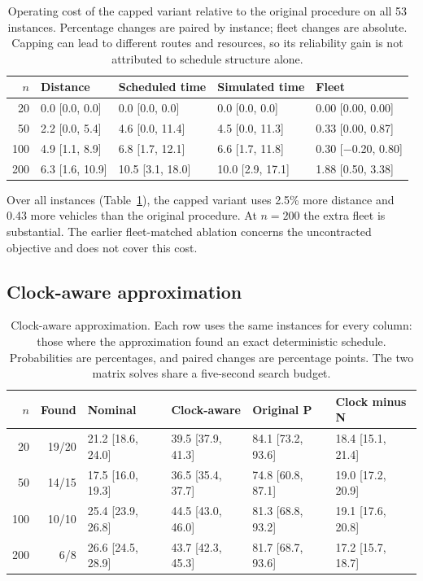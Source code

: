 \begin{table}[htbp]
\centering
\scriptsize
\caption{Operating cost of the capped variant relative to the original procedure on all 53 instances. Percentage changes are paired by instance; fleet changes are absolute. Capping can lead to different routes and resources, so its reliability gain is not attributed to schedule structure alone.}
\label{tab:cap-cost}
\begin{tabular}{rllll}
\toprule
$n$ & Distance & Scheduled time & Simulated time & Fleet\\
\midrule
20 & 0.0 [0.0, 0.0] & 0.0 [0.0, 0.0] & 0.0 [0.0, 0.0] & 0.00 [0.00, 0.00]\\
50 & 2.2 [0.0, 5.4] & 4.6 [0.0, 11.4] & 4.5 [0.0, 11.3] & 0.33 [0.00, 0.87]\\
100 & 4.9 [1.1, 8.9] & 6.8 [1.7, 12.1] & 6.6 [1.7, 11.8] & 0.30 [$-$0.20, 0.80]\\
200 & 6.3 [1.6, 10.9] & 10.5 [3.1, 18.0] & 10.0 [2.9, 17.1] & 1.88 [0.50, 3.38]\\
\bottomrule
\end{tabular}
\end{table}


Over all instances (Table~\ref{tab:cap-cost}), the capped variant uses 2.5\% more distance and 0.43 more vehicles than the original procedure. At $n=200$ the extra fleet is substantial. The earlier fleet-matched ablation concerns the uncontracted objective and does not cover this cost.

\subsection{Clock-aware approximation}

\begin{table}[htbp]
\centering
\scriptsize
\caption{Clock-aware approximation. Each row uses the same instances for every column: those where the approximation found an exact deterministic schedule. Probabilities are percentages, and paired changes are percentage points. The two matrix solves share a five-second search budget.}
\label{tab:clock}
\begin{tabular}{rrllll}
\toprule
$n$ & Found & Nominal & Clock-aware & Original P & Clock minus N\\
\midrule
20 & 19/20 & 21.2 [18.6, 24.0] & 39.5 [37.9, 41.3] & 84.1 [73.2, 93.6] & 18.4 [15.1, 21.4]\\
50 & 14/15 & 17.5 [16.0, 19.3] & 36.5 [35.4, 37.7] & 74.8 [60.8, 87.1] & 19.0 [17.2, 20.9]\\
100 & 10/10 & 25.4 [23.9, 26.8] & 44.5 [43.0, 46.0] & 81.3 [68.8, 93.2] & 19.1 [17.6, 20.8]\\
200 & 6/8 & 26.6 [24.5, 28.9] & 43.7 [42.3, 45.3] & 81.7 [68.7, 93.6] & 17.2 [15.7, 18.7]\\
\bottomrule
\end{tabular}
\end{table}



